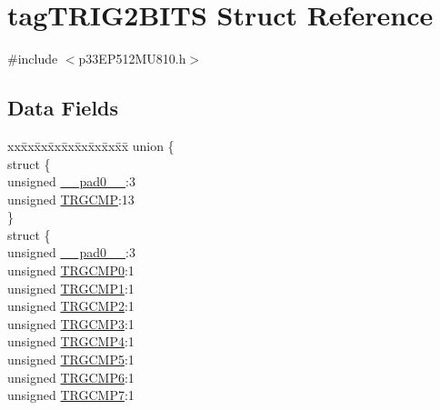 \hypertarget{structtag_t_r_i_g2_b_i_t_s}{}\section{tag\+T\+R\+I\+G2\+B\+I\+TS Struct Reference}
\label{structtag_t_r_i_g2_b_i_t_s}


{\ttfamily \#include $<$p33\+E\+P512\+M\+U810.\+h$>$}

\subsection*{Data Fields}
\begin{DoxyCompactItemize}
\item 
\begin{tabbing}
xx\=xx\=xx\=xx\=xx\=xx\=xx\=xx\=xx\=\kill
union \{\\
\>struct \{\\
\>\>unsigned \hyperlink{structtag_t_r_i_g2_b_i_t_s_adf71f3d8410c1f1dbbc96680a92c49af}{\_\_pad0\_\_}:3\\
\>\>unsigned \hyperlink{structtag_t_r_i_g2_b_i_t_s_aceafdcd310f8a6833f64c9d20ec5567e}{TRGCMP}:13\\
\>\} \\
\>struct \{\\
\>\>unsigned \hyperlink{structtag_t_r_i_g2_b_i_t_s_adf71f3d8410c1f1dbbc96680a92c49af}{\_\_pad0\_\_}:3\\
\>\>unsigned \hyperlink{structtag_t_r_i_g2_b_i_t_s_a592102a5d0362674b8b287b5f8dd9f2a}{TRGCMP0}:1\\
\>\>unsigned \hyperlink{structtag_t_r_i_g2_b_i_t_s_ab2a016c04074d53199dbd32df07c6d09}{TRGCMP1}:1\\
\>\>unsigned \hyperlink{structtag_t_r_i_g2_b_i_t_s_a1fd283d3a2f1005e0d597b4e61399485}{TRGCMP2}:1\\
\>\>unsigned \hyperlink{structtag_t_r_i_g2_b_i_t_s_a823f89a0ad77efa6c3c8d01c3932f03e}{TRGCMP3}:1\\
\>\>unsigned \hyperlink{structtag_t_r_i_g2_b_i_t_s_a2bf01f968c2bba2453f76d1590c70490}{TRGCMP4}:1\\
\>\>unsigned \hyperlink{structtag_t_r_i_g2_b_i_t_s_a6dc78e81c5a3e6993b4558dff9657ee2}{TRGCMP5}:1\\
\>\>unsigned \hyperlink{structtag_t_r_i_g2_b_i_t_s_a9ba81e821299317a829e795392b93beb}{TRGCMP6}:1\\
\>\>unsigned \hyperlink{structtag_t_r_i_g2_b_i_t_s_aa801131b5ab0b542a360d202275ea4fd}{TRGCMP7}:1\\

\end{tabbing}
\end{DoxyCompactItemize}

